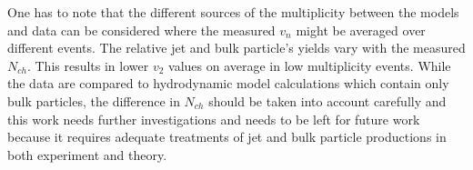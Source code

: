 One has to note that the different sources of the multiplicity between the models and data can be considered where the measured $v_n$ might be averaged over different events. The relative jet and bulk particle's yields vary with the measured $N_{ch}$. This results in lower $v_2$ values on average in low multiplicity events. While the data are compared to hydrodynamic model calculations which contain only bulk particles, the difference in $N_{ch}$ should be taken into account carefully and this work needs further investigations and needs to be left for future work because it requires adequate treatments of jet and bulk particle productions in both experiment and theory.
